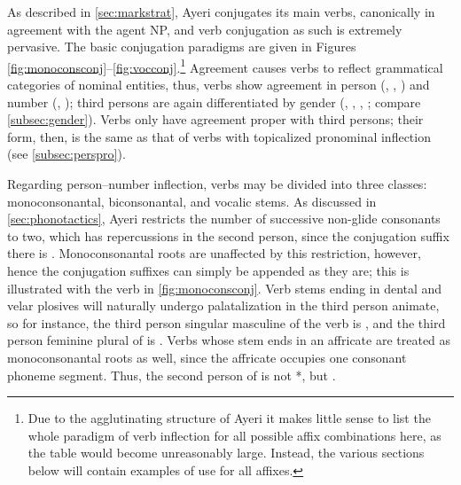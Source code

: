 As described in \autoref{sec:markstrat}, Ayeri conjugates its main verbs,
canonically in agreement with the agent NP, and verb conjugation as such is
extremely pervasive. The basic conjugation paradigms are given in Figures
\ref{fig:monoconsconj}--\ref{fig:vocconj}.\footnote{Due to the agglutinating
structure of Ayeri it makes little sense to list the whole paradigm of verb
inflection for all possible affix combinations here, as the table would become
unreasonably large. Instead, the various sections below will contain examples
of use for all affixes.} Agreement causes verbs to reflect grammatical
categories of nominal entities, thus, verbs show agreement in person
(\First{}, \Second{}, \Third{}) and number (\Sg{}, \Pl{}); third persons are
again differentiated by gender (\M{}, \F{}, \N{}, \Inan{}; compare
\autoref{subsec:gender}). Verbs only have agreement proper with third persons;
their form, then, is the same as that of verbs with topicalized pronominal
inflection (see \autoref{subsec:perspro}).

Regarding person--number inflection, verbs may be divided into three classes: 
monoconsonantal, biconsonantal, and vocalic stems. As discussed in 
\autoref{sec:phonotactics}, Ayeri restricts the number of successive non-glide 
consonants to two, which has repercussions in the second person, since the 
conjugation suffix there is . Monoconsonantal roots are 
unaffected by this restriction, however, hence the conjugation suffixes can 
simply be appended as they are; this is illustrated with the verb 
 in \autoref{fig:monoconsconj}. Verb stems 
ending in dental and velar plosives will naturally undergo palatalization in 
the third person animate, so for instance, the third person singular masculine 
of the verb  is , and the third person feminine plural of  is . Verbs whose 
stem ends in an affricate are treated as monoconsonantal roots as well, since 
the affricate occupies one consonant phoneme segment. Thus, the second 
person of  is not *, but 
.

